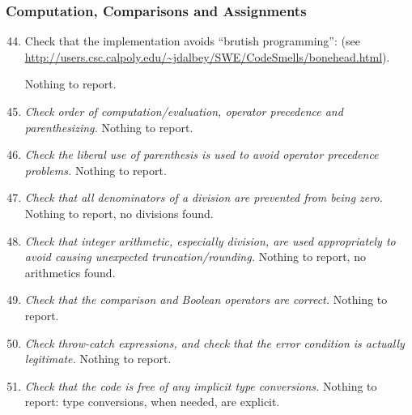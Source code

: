 	\subsubsection{Computation, Comparisons and Assignments}
		\begin{enumerate}
			\setcounter{enumi}{43}
			\item \begin{itshape}
				Check that the implementation avoids “brutish programming”: (see \url{http://users.csc.calpoly.edu/~jdalbey/SWE/CodeSmells/bonehead.html}).
				\end{itshape}
			Nothing to report. %

			\item \textit{Check order of computation/evaluation, operator precedence and parenthesizing.}\newline
			Nothing to report. %

			\item \textit{Check the liberal use of parenthesis is used to avoid operator precedence problems.}\newline
			Nothing to report. %

			\item \textit{Check that all denominators of a division are prevented from being zero.}\newline
			Nothing to report, no divisions found. %

			\item \textit{Check that integer arithmetic, especially division, are used appropriately to avoid causing unexpected truncation/rounding.}\newline
			Nothing to report, no arithmetics found. %

			\item \textit{Check that the comparison and Boolean operators are correct.}\newline
			Nothing to report. %

			\item \textit{Check throw-catch expressions, and check that the error condition is actually legitimate.}
			Nothing to report. %
			
			\item \textit{Check that the code is free of any implicit type conversions.}\newline
			Nothing to report: type conversions, when needed, are explicit. %

		\end{enumerate}

